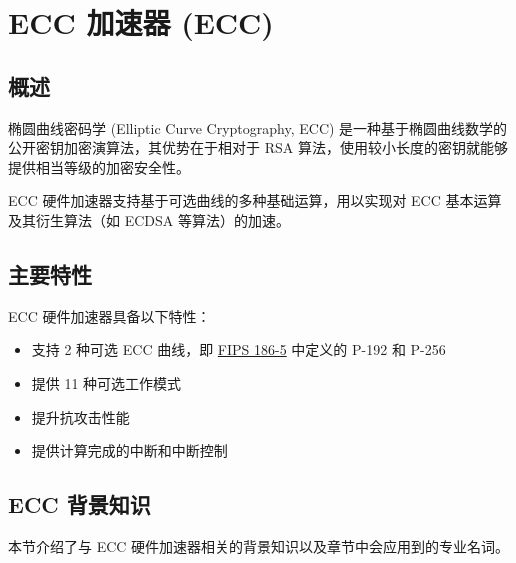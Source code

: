 \documentclass[main\_\_CN.tex]{subfiles}
\begin{document}

\ifglobal
\else
    \listoftodos
    {\let\clearpage\relax \listofdonetodos}
    \tableofcontents
\fi



\hypertarget{ecc}{}
\chapter{ECC 加速器 (ECC)}
\label{mod:ecc}

\section{概述}

椭圆曲线密码学 (Elliptic Curve Cryptography, ECC) 是一种基于椭圆曲线数学的公开密钥加密演算法，其优势在于相对于 RSA 算法，使用较小长度的密钥就能够提供相当等级的加密安全性。

\chipname{} ECC 硬件加速器支持基于可选曲线的多种基础运算，用以实现对 ECC 基本运算及其衍生算法（如 ECDSA 等算法）的加速。

\section{主要特性}

\chipname{} ECC 硬件加速器具备以下特性：

\begin{itemize}
    \item 支持 2 种可选 ECC 曲线，即 \href{https://nvlpubs.nist.gov/nistpubs/FIPS/NIST.FIPS.186-5.pdf}{FIPS 186-5} 中定义的 P-192 和 P-256
    \item 提供 11 种可选工作模式
    \item 提升抗攻击性能
    \item 提供计算完成的中断和中断控制
\end{itemize}

\section{ECC 背景知识}

本节介绍了与 ECC 硬件加速器相关的背景知识以及章节中会应用到的专业名词。
\end{document}
